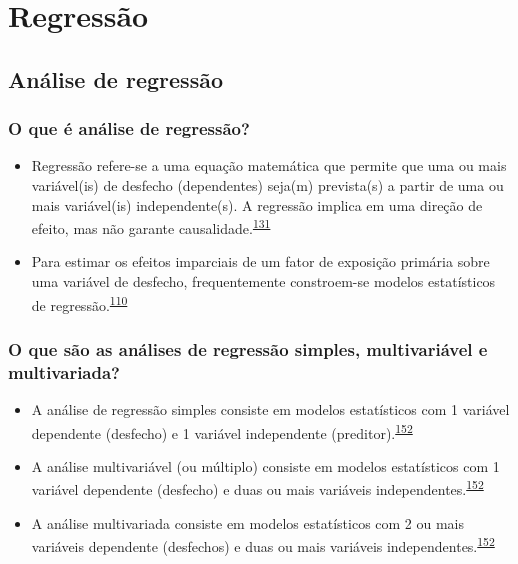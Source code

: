 \documentclass[
  a4paper,
]{book}
\begin{document}
\hypertarget{analise-inferencial-regressao}{%
\chapter{\texorpdfstring{\textbf{Regressão}}{Regressão}}\label{analise-inferencial-regressao}}

\hypertarget{analise-regressao}{%
\section{Análise de regressão}\label{analise-regressao}}

\hypertarget{o-que-uxe9-anuxe1lise-de-regressuxe3o}{%
\subsection{O que é análise de regressão?}\label{o-que-uxe9-anuxe1lise-de-regressuxe3o}}

\begin{itemize}
\item
  Regressão refere-se a uma equação matemática que permite que uma ou mais variável(is) de desfecho (dependentes) seja(m) prevista(s) a partir de uma ou mais variável(is) independente(s). A regressão implica em uma direção de efeito, mas não garante causalidade.\textsuperscript{\protect\hyperlink{ref-greenhalgh1997a}{131}}
\item
  Para estimar os efeitos imparciais de um fator de exposição primária sobre uma variável de desfecho, frequentemente constroem-se modelos estatísticos de regressão.\textsuperscript{\protect\hyperlink{ref-bandoli2018}{110}}
\end{itemize}

\hypertarget{o-que-suxe3o-as-anuxe1lises-de-regressuxe3o-simples-multivariuxe1vel-e-multivariada}{%
\subsection{O que são as análises de regressão simples, multivariável e multivariada?}\label{o-que-suxe3o-as-anuxe1lises-de-regressuxe3o-simples-multivariuxe1vel-e-multivariada}}

\begin{itemize}
\item
  A análise de regressão simples consiste em modelos estatísticos com 1 variável dependente (desfecho) e 1 variável independente (preditor).\textsuperscript{\protect\hyperlink{ref-Hidalgo2013}{152}}
\item
  A análise multivariável (ou múltiplo) consiste em modelos estatísticos com 1 variável dependente (desfecho) e duas ou mais variáveis independentes.\textsuperscript{\protect\hyperlink{ref-Hidalgo2013}{152}}
\item
  A análise multivariada consiste em modelos estatísticos com 2 ou mais variáveis dependente (desfechos) e duas ou mais variáveis independentes.\textsuperscript{\protect\hyperlink{ref-Hidalgo2013}{152}}
\end{itemize}
\end{document}

